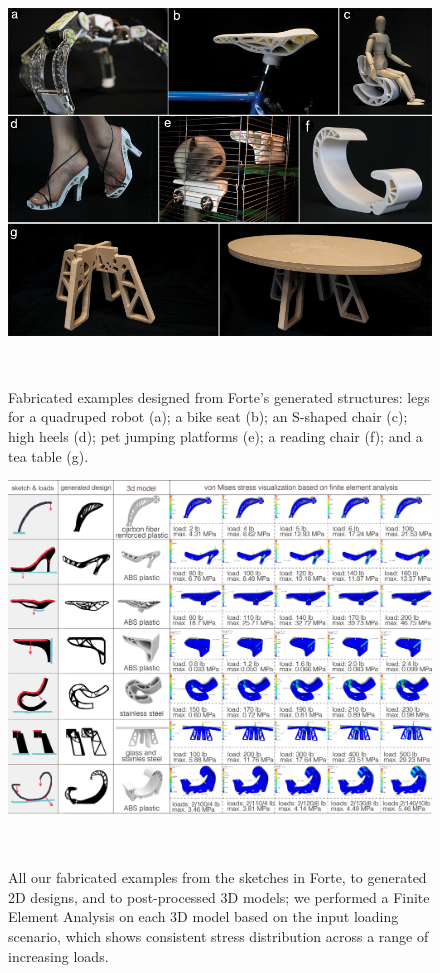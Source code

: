 \begin{figure} [h!]
  \centering
  \vskip 8pt
  \includegraphics[width=1\textwidth]{figures/result_collage}
  \caption{Fabricated examples designed from Forte's generated structures: legs for a quadruped robot (a); a bike seat (b); an S-shaped chair (c); high heels (d); pet jumping platforms (e); a reading chair (f); and a tea table (g).}~\label{fig:result_collage}
\end{figure}


\begin{figure} [t]
  \centering
  \includegraphics[width=1\textwidth]{figures/results}
  \caption{All our fabricated examples from the sketches in Forte, to generated 2D designs, and to post-processed 3D models; we performed a Finite Element Analysis on each 3D model based on the input loading scenario, which shows consistent stress distribution across a range of increasing loads.}~\label{fig:results}
\end{figure}

